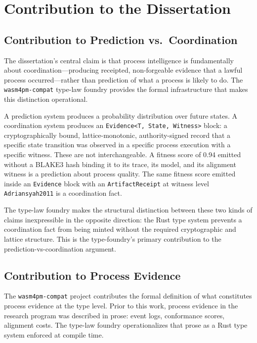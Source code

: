 
\section{Contribution to the Dissertation}
\label{sec:sources-wasm4pm-compat-contribution}

\subsection{Contribution to Prediction vs.~Coordination}
\label{sec:sources-wasm4pm-compat-contribution-prediction}

The dissertation's central claim is that process intelligence is fundamentally about
coordination---producing receipted, non-forgeable evidence that a lawful process
occurred---rather than prediction of what a process is likely to do. The
\texttt{wasm4pm-compat} type-law foundry provides the formal infrastructure that
makes this distinction operational.

A prediction system produces a probability distribution over future states. A coordination
system produces an \texttt{Evidence<T, State, Witness>} block: a cryptographically bound,
lattice-monotonic, authority-signed record that a specific state transition was observed
in a specific process execution with a specific witness. These are not interchangeable.
A fitness score of 0.94 emitted without a BLAKE3 hash binding it to its trace, its model,
and its alignment witness is a prediction about process quality. The same fitness score
emitted inside an \texttt{Evidence} block with an \texttt{ArtifactReceipt} at witness
level \texttt{Adriansyah2011} is a coordination fact.

The type-law foundry makes the structural distinction between these two kinds of claims
inexpressible in the opposite direction: the Rust type system prevents a coordination
fact from being minted without the required cryptographic and lattice structure. This is
the type-foundry's primary contribution to the prediction-vs-coordination argument.

\subsection{Contribution to Process Evidence}
\label{sec:sources-wasm4pm-compat-contribution-evidence}

The \texttt{wasm4pm-compat} project contributes the formal definition of what constitutes
process evidence at the type level. Prior to this work, process evidence in the research
program was described in prose: event logs, conformance scores, alignment costs. The
type-law foundry operationalizes that prose as a Rust type system enforced at compile time.

